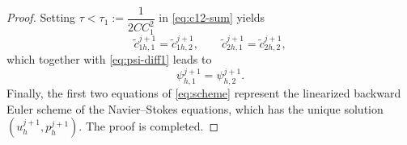 \begin{proof}
Setting $\tau<\tau_{1}:=\dfrac{1}{2CC_{1}^{2}}$ in \eqref{eq:c12-sum} yields
\begin{equation}
  \tilde{c}^{j+1}_{1h,1} = \tilde{c}^{j+1}_{1h,2},
  \qquad
  \tilde{c}^{j+1}_{2h,1} = \tilde{c}^{j+1}_{2h,2},
  \label{eq:c-unique}
\end{equation}
which together with \eqref{eq:psi-diff1} leads to
\begin{equation}
  \psi^{j+1}_{h,1} = \psi^{j+1}_{h,2}.
  \label{eq:psi-unique}
\end{equation}
Finally, the first two equations of \eqref{eq:scheme} represent the
linearized backward Euler scheme of the Navier--Stokes equations, which has
the unique solution $(u^{j+1}_{h},p^{j+1}_{h})$. The proof is completed.
\end{proof}

%
%
%
%
%
%
